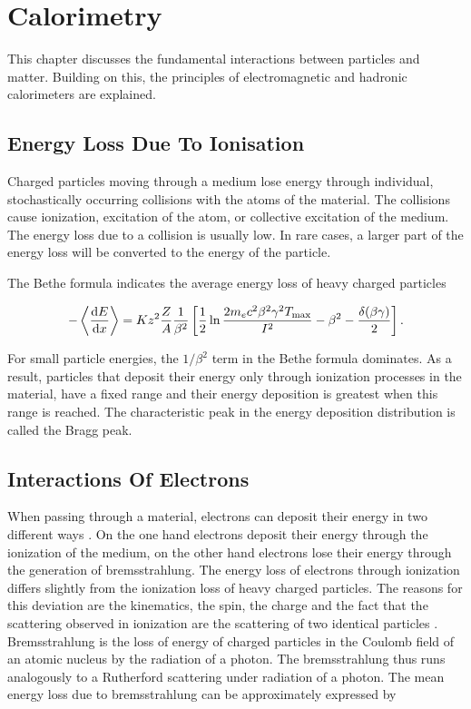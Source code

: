 \documentclass[12pt, a4paper]{thesis}
\begin{document}
\chapter{Calorimetry}
\label{sec:org802b29d}

This chapter discusses the fundamental interactions between particles and
matter.  Building on this, the principles of
electromagnetic and hadronic calorimeters are explained.

\section{Energy Loss Due To Ionisation}
\label{sec:org57bbfcf}

Charged particles moving through a medium lose energy through
individual, stochastically occurring collisions with the atoms of the
material. The collisions cause ionization, excitation of the atom, or
collective excitation of the medium.  The energy loss due to a
collision is usually low. In rare cases, a larger part of the energy
loss will be converted to the energy of the particle.

The Bethe formula indicates the average energy loss of heavy charged particles

\begin{align}
-\expval{\dv{E}{x}} = K z^2 \frac{Z}{A} \frac{1}{\beta^{2}} \left[ \frac{1}{2} \ln{\frac{2 m_{e} c^{2} \beta^{2} \gamma^{2} T_{\text{max}}}{I^{2}}}-\beta^{2} - \frac{\delta(\beta\gamma)}{2}\right].
\end{align}

For small particle energies, the \(1/\beta^2\) term in the Bethe formula
dominates. As a result, particles that deposit their energy only
through ionization processes in the material, have a fixed range and
their energy deposition is greatest when this range is reached. The
characteristic peak in the energy deposition distribution is called
the Bragg peak.

\section{Interactions Of Electrons}
\label{sec:org978e80c}

When passing through a material, electrons can deposit their energy in
two different ways \cite{kolanoski16}. On the one hand electrons
deposit their energy through the ionization of the medium, on the
other hand electrons lose their energy through the generation of
bremsstrahlung.  The energy loss of electrons through ionization
differs slightly from the ionization loss of heavy charged
particles. The reasons for this deviation are the kinematics, the
spin, the charge and the fact that the scattering observed in
ionization are the scattering of two identical particles
\cite{PhysRevD.98.030001}.  Bremsstrahlung is the loss of energy of
charged particles in the Coulomb field of an atomic nucleus by the
radiation of a photon. The bremsstrahlung thus runs analogously to a
Rutherford scattering under radiation of a photon.  The mean energy
loss due to bremsstrahlung can be approximately expressed by
\end{document}
